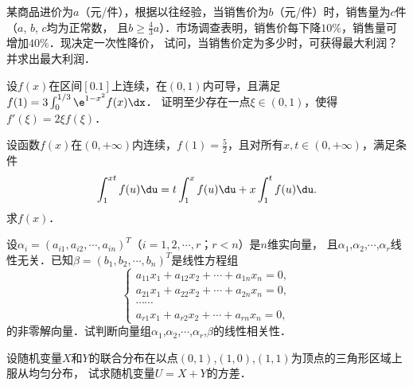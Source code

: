 \documentclass[plain,noanswer,medmath]{../../template/jnuexam}
\begin{document}




\begin{problem}
某商品进价为$a$（元/件），根据以往经验，当销售价为$b$（元/件）时，销售量为$c$件（$a$, $b$, $c$均为正常数，
且$b \ge \frac{4}{3}a$）．市场调查表明，销售价每下降$10\%$，销售量可增加$40\%$．现决定一次性降价，
试问，当销售价定为多少时，可获得最大利润？并求出最大利润．
\end{problem}



\begin{problem}
设$f(x)$在区间$[0.1]$上连续，在$(0,1)$内可导，且满足$f(1) = 3\int_0^{1/3} \e^{1 - x^2} f(x)\dx $．
证明至少存在一点$\xi \in(0,1)$，使得$f'(\xi) = 2\xi f(\xi)$．
\end{problem}



\begin{problem}
设函数$f(x)$在$(0, +\infty)$内连续，$f(1) = \frac{5}{2}$，且对所有$x,t \in(0, +\infty)$，满足条件
$$\int_1^{xt} f(u)\du = t\int_1^x f(u)\du + x\int_1^t f(u)\du .$$
求$f(x)$．
\end{problem}






\begin{problem}
设$\alpha_i = (a_{i1},a_{i2}, \cdots ,a_{in})^T$（$i = 1,2, \cdots ,r$；$r < n$）是$n$维实向量，
且$\alpha_1$,$\alpha_2$,$\cdots$,$\alpha_r$线性无关．已知$\beta = (b_1,b_2, \cdots ,b_n)^T$是线性方程组
$$\begin{cases}
  a_{11}x_1 + a_{12}x_2 + \cdots + a_{1n}x_n = 0, \\
  a_{21}x_1 + a_{22}x_2 + \cdots + a_{2n}x_n = 0, \\
  \cdots \cdots \\
  a_{r1}x_1 + a_{r2}x_2 + \cdots + a_{rn}x_n = 0,
\end{cases}$$
的非零解向量．试判断向量组$\alpha_1$,$\alpha_2$,$\cdots$,$\alpha_r$,$\beta$的线性相关性．
\end{problem}






\begin{problem}
设随机变量$X$和$Y$的联合分布在以点$(0,1)$,$(1,0)$,$(1,1)$为顶点的三角形区域上服从均匀分布，
试求随机变量$U = X + Y$的方差．
\end{problem}
\end{document}
